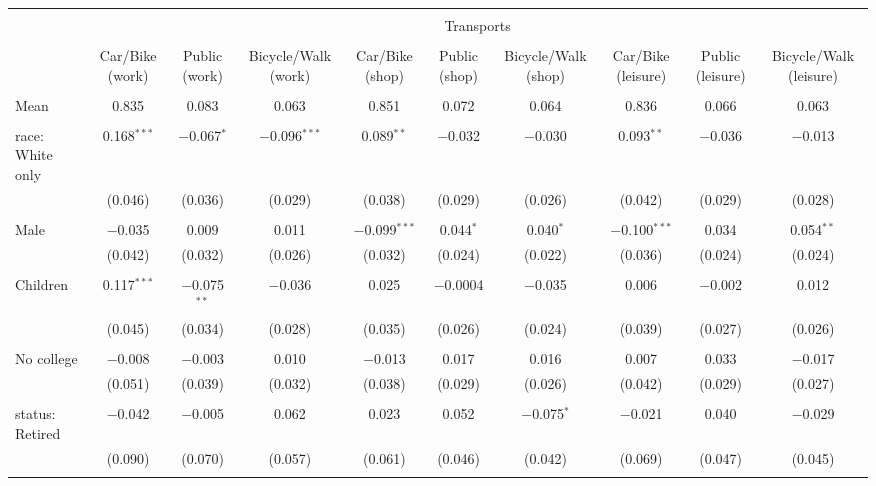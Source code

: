 
\begin{tabular}{@{\extracolsep{5pt}}lccccccccc} 
\\[-1.8ex]\hline 
\hline \\[-1.8ex] 
 & \multicolumn{9}{c}{Transports} \\ 
\cline{2-10} 
\\[-1.8ex] & Car/Bike (work) & Public (work) & Bicycle/Walk (work) & Car/Bike (shop) & Public (shop) & Bicycle/Walk (shop) & Car/Bike (leisure) & Public (leisure) & Bicycle/Walk (leisure) \\ 
\hline \\[-1.8ex] 
 Mean & 0.835 & 0.083 & 0.063 & 0.851 & 0.072 & 0.064 & 0.836 & 0.066 & 0.063  \\ \hline \\[-1.8ex] race: White only & 0.168$^{***}$ & $-$0.067$^{*}$ & $-$0.096$^{***}$ & 0.089$^{**}$ & $-$0.032 & $-$0.030 & 0.093$^{**}$ & $-$0.036 & $-$0.013 \\ 
  & (0.046) & (0.036) & (0.029) & (0.038) & (0.029) & (0.026) & (0.042) & (0.029) & (0.028) \\ 
  & & & & & & & & & \\ 
 Male & $-$0.035 & 0.009 & 0.011 & $-$0.099$^{***}$ & 0.044$^{*}$ & 0.040$^{*}$ & $-$0.100$^{***}$ & 0.034 & 0.054$^{**}$ \\ 
  & (0.042) & (0.032) & (0.026) & (0.032) & (0.024) & (0.022) & (0.036) & (0.024) & (0.024) \\ 
  & & & & & & & & & \\ 
 Children & 0.117$^{***}$ & $-$0.075$^{**}$ & $-$0.036 & 0.025 & $-$0.0004 & $-$0.035 & 0.006 & $-$0.002 & 0.012 \\ 
  & (0.045) & (0.034) & (0.028) & (0.035) & (0.026) & (0.024) & (0.039) & (0.027) & (0.026) \\ 
  & & & & & & & & & \\ 
 No college & $-$0.008 & $-$0.003 & 0.010 & $-$0.013 & 0.017 & 0.016 & 0.007 & 0.033 & $-$0.017 \\ 
  & (0.051) & (0.039) & (0.032) & (0.038) & (0.029) & (0.026) & (0.042) & (0.029) & (0.027) \\ 
  & & & & & & & & & \\ 
 status: Retired & $-$0.042 & $-$0.005 & 0.062 & 0.023 & 0.052 & $-$0.075$^{*}$ & $-$0.021 & 0.040 & $-$0.029 \\ 
  & (0.090) & (0.070) & (0.057) & (0.061) & (0.046) & (0.042) & (0.069) & (0.047) & (0.045) \\ 
  & & & & & & & & & \\ 

\end{tabular}
